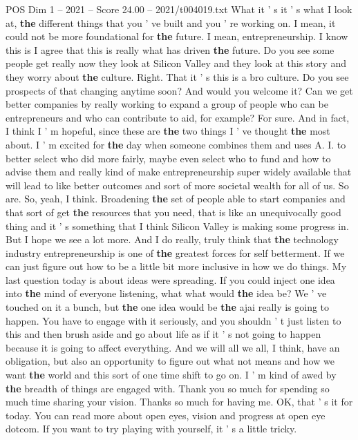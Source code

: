 \begin{textsample}{POS Dim 1 – 2021 – Score 24.00 – 2021/t004019.txt}
What it ' s it ' s what I look at, \textbf{the} different things that you ' ve built and you ' re working on.
I mean, it could not be more foundational for \textbf{the} future.
I mean, entrepreneurship.
I know this is I agree that this is really what has driven \textbf{the} future.
Do you see some people get really now they look at Silicon Valley and they look at this story and they worry about \textbf{the} culture.
Right.
That it ' s this is a bro culture.
Do you see prospects of that changing anytime soon?
And would you welcome it?
Can we get better companies by really working to expand a group of people who can be entrepreneurs and who can contribute to aid, for example?
For sure.
And in fact, I think I ' m hopeful, since these are \textbf{the} two things I ' ve thought \textbf{the} most about.
I ' m excited for \textbf{the} day when someone combines them and uses A.
I. to better select who did more fairly, maybe even select who to fund and how to advise them and really kind of make entrepreneurship super widely available that will lead to like better outcomes and sort of more societal wealth for all of us.
So are.
So, yeah, I think.
Broadening \textbf{the} set of people able to start companies and that sort of get \textbf{the} resources that you need, that is like an unequivocally good thing and it ' s something that I think Silicon Valley is making some progress in.
But I hope we see a lot more.
And I do really, truly think that \textbf{the} technology industry entrepreneurship is one of \textbf{the} greatest forces for self betterment.
If we can just figure out how to be a little bit more inclusive in how we do things.
My last question today is about ideas were spreading.
If you could inject one idea into \textbf{the} mind of everyone listening, what what would \textbf{the} idea be?
We ' ve touched on it a bunch, but \textbf{the} one idea would be \textbf{the} ajai really is going to happen.
You have to engage with it seriously, and you shouldn ' t just listen to this and then brush aside and go about life as if it ' s not going to happen because it is going to affect everything.
And we will all we all, I think, have an obligation, but also an opportunity to figure out what not means and how we want \textbf{the} world and this sort of one time shift to go on.
I ' m kind of awed by \textbf{the} breadth of things are engaged with.
Thank you so much for spending so much time sharing your vision.
Thanks so much for having me.
OK, that ' s it for today.
You can read more about open eyes, vision and progress at open eye dotcom.
If you want to try playing with yourself, it ' s a little tricky.

\end{textsample}
